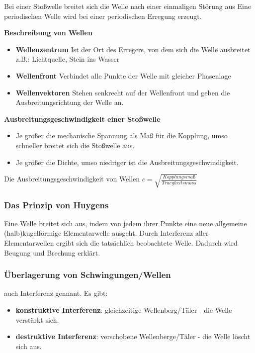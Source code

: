 \documentclass[../document.tex]{subfiles}
\begin{document}
Bei einer Stoßwelle breitet sich die Welle nach einer einmaligen Störung aus
Eine periodischen Welle wird bei einer periodischen Erregung erzeugt.

\textbf{Beschreibung von Wellen}
\begin{itemize}
	\item \textbf{Wellenzentrum} Ist der Ort des Erregers, von dem sich die Welle ausbreitet\\z.B.: Lichtquelle, Stein ins Wasser
	\item \textbf{Wellenfront} Verbindet alle Punkte der Welle mit gleicher Phasenlage
	\item \textbf{Wellenvektoren} Stehen senkrecht auf der Wellenfront und geben die Ausbreitungsrichtung der Welle an.
\end{itemize}

\textbf{Ausbreitungsgeschwindigkeit einer Stoßwelle}
\begin{itemize}
	\item Je größer die mechanische Spannung als Maß für die Kopplung, umso schneller breitet sich die Stoßwelle aus.
	\item Je größer die Dichte, umso niedriger ist die Ausbreitungsgeschwindigkeit.
\end{itemize}

Die Ausbreitungsgeschwindigkeit von Wellen $c = \sqrt{\frac{Kopplungsmaß}{Traegheitsmass}}$

\subsubsection{Das Prinzip von Huygens}

Eine Welle breitet sich aus, indem von jedem ihrer Punkte eine neue allgemeine (halb)kugelförmige Elementarwelle ausgeht. Durch Interferenz aller Elementarwellen ergibt sich die tatsächlich beobachtete Welle. Dadurch wird Beugung und Brechung erklärt.

\subsubsection{Überlagerung von Schwingungen/Wellen}
auch Interferenz gennant. Es gibt:
\begin{itemize}
	\item \textbf{konstruktive Interferenz}: gleichzeitige Wellenberg/Täler - die Welle verstärkt sich.
	\item \textbf{destruktive Interferenz}: verschobene Wellenberge/Täler - die Welle löscht sich aus.
\end{itemize}
\end{document}

